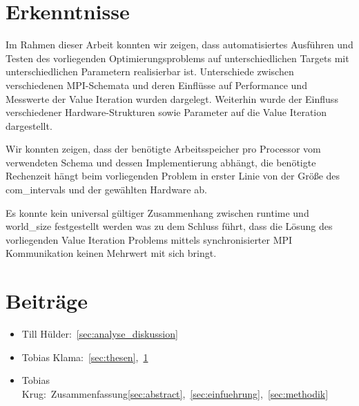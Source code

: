 \section{Erkenntnisse}
\label{sec:erkenntnisse}
Im Rahmen dieser Arbeit konnten wir zeigen, dass automatisiertes Ausführen und Testen des vorliegenden Optimierungsproblems
auf unterschiedlichen Targets mit unterschiedlichen Parametern realisierbar ist.
Unterschiede zwischen verschiedenen MPI-Schemata und deren Einflüsse auf Performance und Messwerte der Value Iteration wurden dargelegt.
Weiterhin wurde der Einfluss verschiedener Hardware-Strukturen sowie Parameter auf die Value Iteration dargestellt.

Wir konnten zeigen, dass der benötigte Arbeitsspeicher pro Processor vom verwendeten Schema und dessen Implementierung abhängt,
die benötigte Rechenzeit hängt beim vorliegenden Problem in erster Linie von der Größe des com\_intervals und der gewählten Hardware ab.

Es konnte kein universal gültiger Zusammenhang zwischen runtime und world\_size festgestellt werden was zu dem Schluss führt, dass
die Lösung des vorliegenden Value Iteration Problems mittels synchronisierter MPI Kommunikation keinen Mehrwert mit sich bringt.

\section{Beiträge}
\label{sec:beitraege}

\begin{itemize}
    \item Till Hülder:~\ref{sec:analyse_diskussion}
    \item Tobias Klama:~\ref{sec:thesen},~\ref{sec:erkenntnisse}
    \item Tobias Krug:~Zusammenfassung\ref{sec:abstract},~\ref{sec:einfuehrung},~\ref{sec:methodik}
\end{itemize}